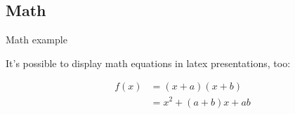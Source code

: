 \subsection{Math}
  
\begin{frame}{Math example}

  It's possible to display math equations in latex presentations, too:

  \begin{align*}
   f(x) &= (x+a)(x+b) \\
        &= x^2 + (a+b)x + ab
  \end{align*}

\end{frame}